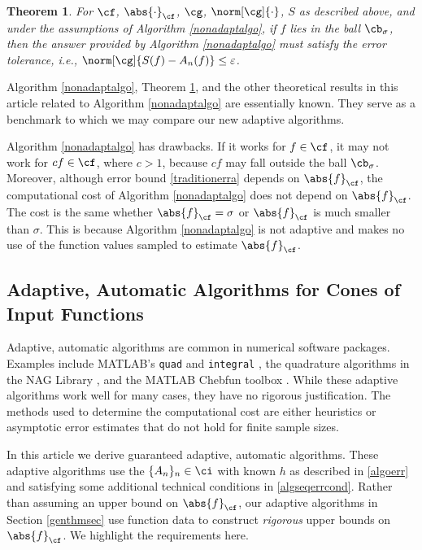 \documentclass[]{elsarticle}
\newtheorem{theorem}{Theorem}
\theoremstyle{definition}
\theoremstyle{remark}
\newcommand{\Fnorm}[1]{\abs{#1}_{\cf}}
\newcommand{\Gnorm}[1]{\norm[\cg]{#1}}
\begin{document}
\begin{theorem}  \label{NonAdaptDetermThm}  For $\cf$, $\Fnorm{\cdot}$, $\cg$, $\Gnorm{\cdot}$, $S$ as described above, and under the assumptions of Algorithm \ref{nonadaptalgo}, if $f$ lies in the ball $\cb_\sigma$, then the answer provided by Algorithm \ref{nonadaptalgo} must satisfy the error tolerance, i.e., $\norm[\cg]{S(f)-A_n(f)} \le \varepsilon$.
\end{theorem}

Algorithm \ref{nonadaptalgo}, Theorem \ref{NonAdaptDetermThm}, and the other theoretical results in this article related to Algorithm \ref{nonadaptalgo} are essentially known.  They serve as a benchmark to which we may compare our new adaptive algorithms.  

Algorithm \ref{nonadaptalgo} has drawbacks.  If it works for $f \in \cf$, it may not work for $cf \in \cf$, where $c>1$, because $cf$ may fall outside the ball $\cb_\sigma$.  Moreover, although error bound \eqref{traditionerra} depends on $\Fnorm{f}$, the computational cost of Algorithm \ref{nonadaptalgo} does not depend on $\Fnorm{f}$.  The cost is the same whether $\Fnorm{f}=\sigma$ or $\Fnorm{f}$ is much smaller than $\sigma$.  This is because Algorithm \ref{nonadaptalgo} is not adaptive and makes no use of the function values sampled to estimate $\Fnorm{f}$.

\subsection{Adaptive, Automatic Algorithms for Cones of Input Functions} \label{adapintrosec}

Adaptive, automatic algorithms are common in numerical software packages.  Examples include  MATLAB's {\tt quad} and {\tt integral} \cite{MAT8.1}, the quadrature algorithms in the NAG Library \cite{NAG23}, and the MATLAB Chebfun toolbox \cite{TrefEtal12}.  While these adaptive algorithms work well for many cases, they have no rigorous justification. The methods used to determine the computational cost are either heuristics or asymptotic error estimates that do not hold for finite sample sizes.

In this article we derive guaranteed adaptive, automatic algorithms.  These adaptive algorithms use the $\{A_n\}_n \in \ci$ with known $h$ as described in \eqref{algoerr} and satisfying some additional technical conditions in \eqref{algseqerrcond}.  Rather than assuming an upper bound on $\Fnorm{f}$, our adaptive algorithms in Section \ref{genthmsec} use function data to construct \emph{rigorous} upper bounds on $\Fnorm{f}$.  We highlight the requirements here.
\end{document}
